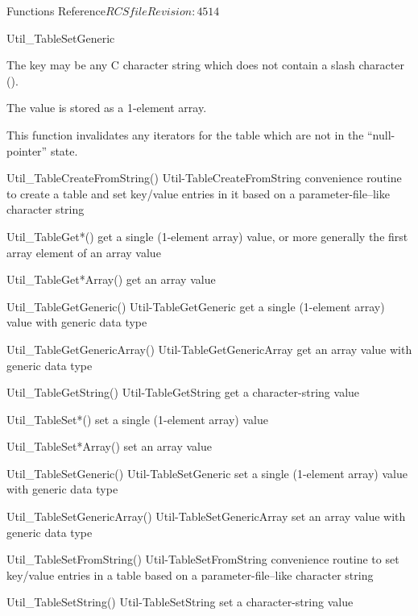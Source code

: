 \begin{cactuspart}{ Functions Reference}{$RCSfile$}{$Revision: 4514 $}
\begin{FunctionDescription}{Util\_TableSetGeneric}
\begin{Discussion}
The key may be any C character string which does not contain a slash
character ().

The value is stored as a 1-element array.

This function invalidates any iterators for the table which are
not in the ``null-pointer'' state.
\end{Discussion}

\begin{SeeAlsoSection}
\begin{SeeAlso2} {Util\_TableCreateFromString()} {Util-TableCreateFromString}
convenience routine to create a table and set key/value entries
in it based on a parameter-file--like character string
\end{SeeAlso2}
\begin{SeeAlso}{Util\_TableGet*()}
get a single (1-element array) value,
or more generally the first array element of an array value
\end{SeeAlso}
\begin{SeeAlso}{Util\_TableGet*Array()}
get an array value
\end{SeeAlso}
\begin{SeeAlso2} {Util\_TableGetGeneric()} {Util-TableGetGeneric}
get a single (1-element array) value with generic data type
\end{SeeAlso2}
\begin{SeeAlso2} {Util\_TableGetGenericArray()} {Util-TableGetGenericArray}
get an array value with generic data type
\end{SeeAlso2}
\begin{SeeAlso2} {Util\_TableGetString()} {Util-TableGetString}
get a character-string value
\end{SeeAlso2}
\begin{SeeAlso}{Util\_TableSet*()}
set a single (1-element array) value
\end{SeeAlso}
\begin{SeeAlso}{Util\_TableSet*Array()}
set an array value
\end{SeeAlso}
\begin{SeeAlso2} {Util\_TableSetGeneric()} {Util-TableSetGeneric}
set a single (1-element array) value with generic data type
\end{SeeAlso2}
\begin{SeeAlso2} {Util\_TableSetGenericArray()} {Util-TableSetGenericArray}
set an array value with generic data type
\end{SeeAlso2}
\begin{SeeAlso2} {Util\_TableSetFromString()} {Util-TableSetFromString}
convenience routine to set key/value entries in a table based on a
parameter-file--like character string
\end{SeeAlso2}
\begin{SeeAlso2} {Util\_TableSetString()} {Util-TableSetString}
set a character-string value
\end{SeeAlso2}
\end{SeeAlsoSection}


\end{FunctionDescription}
\end{cactuspart}
